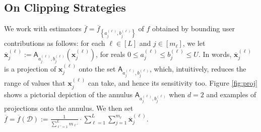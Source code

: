 \label{sec:bound}
\subsection{On Clipping Strategies}
We work with estimators $\overline{f} = \overline{f}_{\left\{a_j^{(\ell)},b_j^{(\ell)}\right\}}$ of $f$ obtained by bounding user contributions as follows: for each $\ell\in [L]$ and $j\in [m_\ell]$, we let $\overline{\mathbf{x}}_j^{(\ell)}:= {\mathsf{A}_{a_j^{(\ell)},b_j^{(\ell)}}}\left(\mathbf{x}_j^{(\ell)}\right)$, for reals $0\leq a_j^{(\ell)}\leq b_j^{(\ell)}\leq U$. In words, $\overline{\mathbf{x}}_j^{(\ell)}$ is a projection of $\mathbf{x}_j^{(\ell)}$ onto the set $\mathsf{A}_{a_j^{(\ell)},b_j^{(\ell)}}$, which, intuitively, reduces the range of values that $\mathbf{x}_j^{(\ell)}$ can take, and hence its sensitivity too. Figure \ref{fig:proj} shows a pictorial depiction of the annulus $\mathsf{A}_{a_j^{(\ell)},b_j^{(\ell)}}$ when $d=2$ and examples of projections onto the annulus. We then set 
$
\overline{f} = \overline{f}(\mathcal{D}):= \frac{1}{\sum_{\ell'=1}^L m_{\ell'}}\cdot \sum_{\ell=1}^L \sum_{j=1}^{m_\ell} \mathbf{\overline{x}}_j^{(\ell)}.
$
